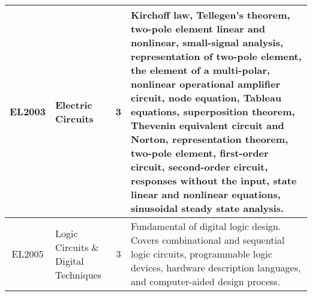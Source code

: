 \documentclass{article}
\begin{document}
\begin{center}
\begin{tabular}{ | c | B{5.4cm} | c | p{6.7cm} |}
            EL2003 & Electric Circuits & 3 & Kirchoff law, Tellegen's theorem, two-pole element linear and nonlinear, small-signal analysis, representation of two-pole element, the element of a multi-polar, nonlinear operational amplifier circuit, node equation, Tableau equations, superposition theorem, Thevenin equivalent circuit and Norton, representation theorem, two-pole element, first-order circuit, second-order circuit, responses without the input, state linear and nonlinear equations, sinusoidal steady state analysis. \\ \hline     
            
            EL2005 & Logic Circuits \& Digital Techniques & 3 & Fundamental of digital logic design. Covers combinational and sequential logic circuits, programmable logic devices, hardware description languages, and computer-aided design process. \\ \hline                   
                         
        \end{tabular}
    \end{center}     
    
    \newpage
    
\end{document}
